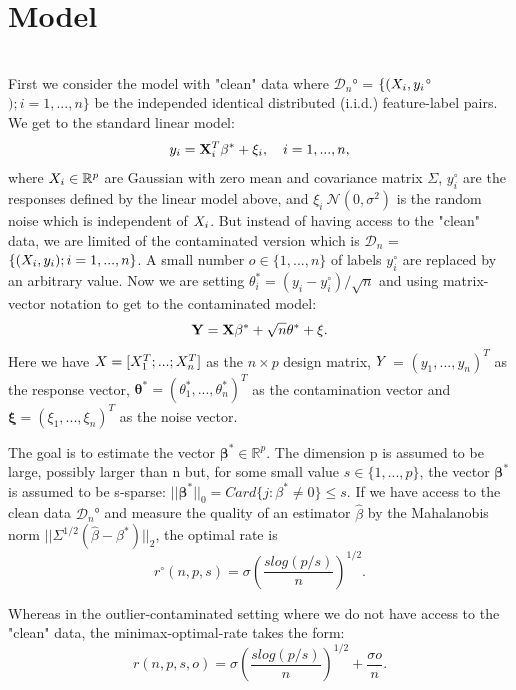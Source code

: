 \documentclass[a4paper,10pt]{article}
\theoremstyle{definition}
\begin{document}
\section{Model}\ \\
First we consider the model with "clean" data where
	$\mathcal{D}_n$° = $\{(\boldmath{X}_i, y_i$°$); i = 1,...,n \}$ be the independed identical distributed (i.i.d.) feature-label pairs. We get to the standard linear model:
\begin{equation}
	y_i = \bold{X}_i^T\beta^* + \xi_i, \quad i=1,...,n,
\end{equation}
where $\boldmath{X}_i \in \mathbb{R}^p$ are Gaussian with zero mean and covariance matrix $\Sigma$,
$y_i^{\circ}$ are the responses defined by the linear model above,
and $\xi_i ~ \mathcal{N}(0,\sigma^2)$ is the random noise which is independent of $\boldmath{X}_i$.
But instead of having access to the "clean" data, we are limited of the contaminated version which is $\mathcal{D}_n$ = $\{(\boldmath{X}_i, y_i); i = 1,...,n \}$. A small number $o \in \{1,...,n\}$ of labels $y_i^{\circ}$ are replaced by an arbitrary value.
Now we are setting $\theta^*_i = (y_i - y_i^{\circ})/\sqrt{n}$ and using matrix-vector notation to get to the contaminated model:
\begin{equation}
	\bold{Y} = \bold{X\beta^*} + \sqrt{n} \bold{\theta^*} + \bold{\xi}.
\end{equation}
Here we have $\boldmath{X} = [\boldmath{X}_1^T;...;\boldmath{X}^T_n]$ as the $n\times p$ design matrix, $\boldmath{Y}$ = $(y_1,...,y_n)^T$ as the response vector, $ \boldsymbol{\theta^*} = (\theta^*_1,...,\theta^*_n)^T$ as the contamination vector and $\boldsymbol{\xi} = (\xi_1,...,\xi_n)^T$ as the noise vector.

The goal is to estimate the vector $\boldsymbol{\beta}^* \in \mathbb{R}^p$. The dimension p is assumed to be large, possibly larger than n but, for some small value $s \in \{1,...,p\}$, the vector $\boldsymbol{\beta}^*$ is assumed to be s-sparse: $||\boldsymbol{\beta}^*||_0 = Card\{j:\beta^* \neq 0\} \leq s$. If we have access to the clean data $\mathcal{D}_n$° and measure the quality of an estimator $\hat{\beta}$ by the Mahalanobis norm $||\Sigma^{1/2}(\hat{\beta}- \beta^*)||_2$, the optimal rate is 
\begin{equation}
	r^{\circ}(n,p,s) = \sigma(\frac{slog(p/s)}{n})^{1/2}.
\end{equation}

Whereas in the outlier-contaminated setting where we do not have access to the "clean" data, the minimax-optimal-rate takes the form:
\begin{equation}
	r(n,p,s,o) = \sigma(\frac{slog(p/s)}{n})^{1/2} + \frac{\sigma o}{n}.
\end{equation}
\end{document}
